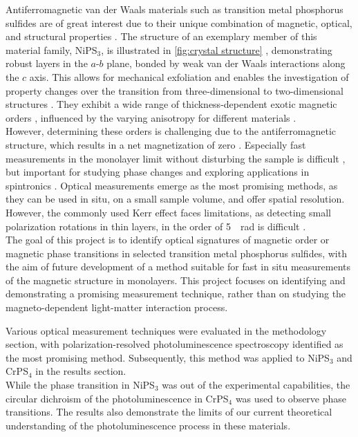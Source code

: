 \documentclass[
	twoside,
	parskip=half,
	a4paper,
]{scrbook}
\begin{document}
Antiferromagnetic van der Waals materials such as transition metal phosphorus sulfides are of great interest due to their unique combination of magnetic, optical, and structural properties \cite{MPX_review}. 
The structure of an exemplary member of this material family, NiPS$_3$, is illustrated in \autoref{fig:crystal structure} \cite{NiPS3_coherent}, demonstrating robust layers in the $a$-$b$ plane, bonded by weak van der Waals interactions along the $c$ axis.
This allows for mechanical exfoliation and enables the investigation of property changes over the transition from three-dimensional to two-dimensional structures \cite{MPX_review}.
They exhibit a wide range of thickness-dependent exotic magnetic orders \cite{AFM_review}, influenced by the varying anisotropy for different materials \cite{MPS_magnetism, CrPS4_magnetic}.\\
However, determining these orders is challenging due to the antiferromagnetic structure, which results in a net magnetization of zero \cite{MPX_review,MPS_magnetism,afm}.
Especially fast measurements in the monolayer limit without disturbing the sample is difficult \cite{AFM_review, CrPS4_magnetic}, but important for studying phase changes and exploring applications in spintronics \cite{AFM_review}.
Optical measurements emerge as the most promising methods, as they can be used in situ, on a small sample volume, and offer spatial resolution. 
However, the commonly used Kerr effect faces limitations, as detecting small polarization rotations in thin layers, in the order of \SI{5}{\mu rad} is difficult \cite{AFM_review}.\\
The goal of this project is to identify optical signatures of magnetic order or magnetic phase transitions in selected transition metal phosphorus sulfides, with the aim of future development of a method suitable for fast in situ measurements of the magnetic structure in monolayers.
This project focuses on identifying and demonstrating a promising measurement technique, rather than on studying the magneto-dependent light-matter interaction process.

Various optical measurement techniques were evaluated in the methodology section, with polarization-resolved photoluminescence spectroscopy identified as the most promising method.
Subsequently, this method was applied to NiPS$_3$ and CrPS$_4$ in the results section.\\
While the phase transition in NiPS$_3$ was out of the experimental capabilities, the circular dichroism of the photoluminescence in CrPS$_4$ was used to observe phase transitions.
The results also demonstrate the limits of our current theoretical understanding of the photoluminescence process in these materials. 
\end{document}

